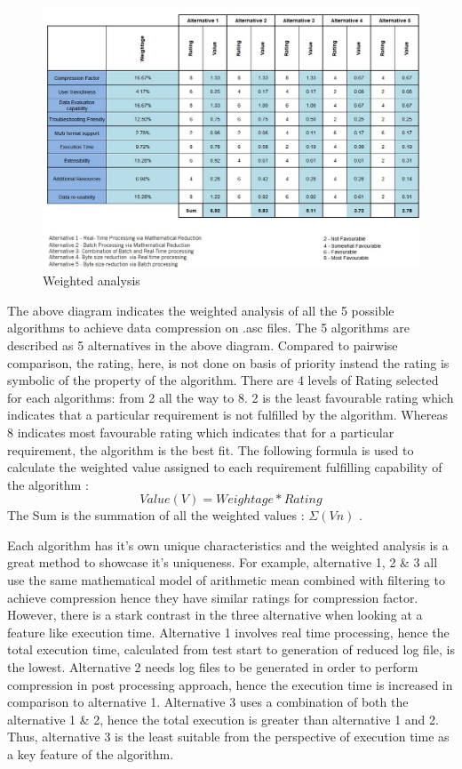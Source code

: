 \begin{figure}[!h]
    	\centering
    	\includegraphics[width= 1\textwidth]{images/Weighted Analysis.jpg}
    	\caption [Weighted Analysis]{Weighted analysis}  
    	\label{fig:Weighted Analysis}
\end{figure}

The above diagram indicates the weighted analysis of all the 5 possible algorithms to achieve data compression on .asc files. The 5 algorithms are described as 5 alternatives in the above diagram. Compared to pairwise comparison, the rating, here, is not done on basis of priority instead the rating is symbolic of the property of the algorithm. There are 4 levels of Rating selected for each algorithms: from 2 all the way to 8. 2 is the least favourable rating which indicates that a particular requirement is not fulfilled by the algorithm. Whereas 8 indicates most favourable rating which indicates that for a particular requirement, the algorithm is the best fit. The following formula is used to calculate the weighted value assigned to each requirement fulfilling capability of the algorithm :
\begin{equation}
 Value (V)  = Weightage * Rating
\end{equation}
The Sum is the summation of all the weighted values : $\Sigma(Vn)$ . 

Each algorithm has it's own unique characteristics and the weighted analysis is a great method to showcase it's uniqueness. For example, alternative 1, 2 \& 3 all use the same mathematical model of arithmetic mean combined with filtering to achieve compression hence they have similar ratings for compression factor. However, there is a stark contrast in the three alternative when looking at a feature like execution time. Alternative 1 involves real time processing, hence the total execution time, calculated from test start to generation of reduced log file, is the lowest. Alternative 2 needs log files to be generated in order to perform compression in post processing approach, hence the execution time is increased in comparison to alternative 1. Alternative 3 uses a combination of both the alternative 1 \& 2, hence the total execution is greater than alternative 1 and 2. Thus, alternative 3 is the least suitable from the perspective of execution time as a key feature of the algorithm. 

